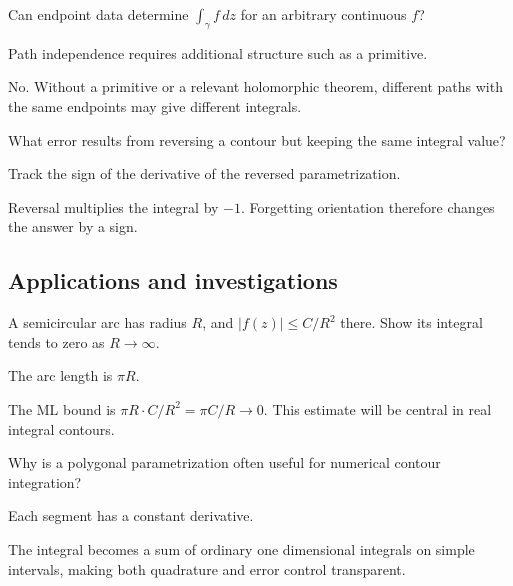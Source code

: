 \begin{exercise}\label{exr:iv04-expand-11}
Can endpoint data determine \(\int_\gamma f\,dz\) for an arbitrary continuous \(f\)?
\end{exercise}
\begin{hint}
Path independence requires additional structure such as a primitive.
\end{hint}
\begin{solution}
No. Without a primitive or a relevant holomorphic theorem, different paths with the same endpoints may give different integrals.
\end{solution}

\begin{exercise}\label{exr:iv04-expand-12}
What error results from reversing a contour but keeping the same integral value?
\end{exercise}
\begin{hint}
Track the sign of the derivative of the reversed parametrization.
\end{hint}
\begin{solution}
Reversal multiplies the integral by \(-1\). Forgetting orientation therefore changes the answer by a sign.
\end{solution}

\subsection*{Applications and investigations}

\begin{exercise}\label{exr:iv04-expand-13}
A semicircular arc has radius \(R\), and \(|f(z)|\le C/R^2\) there. Show its integral tends to zero as \(R\to\infty\).
\end{exercise}
\begin{hint}
The arc length is \(\pi R\).
\end{hint}
\begin{solution}
The ML bound is \(\pi R\cdot C/R^2=\pi C/R\to0\). This estimate will be central in real integral contours.
\end{solution}

\begin{exercise}\label{exr:iv04-expand-14}
Why is a polygonal parametrization often useful for numerical contour integration?
\end{exercise}
\begin{hint}
Each segment has a constant derivative.
\end{hint}
\begin{solution}
The integral becomes a sum of ordinary one dimensional integrals on simple intervals, making both quadrature and error control transparent.
\end{solution}

